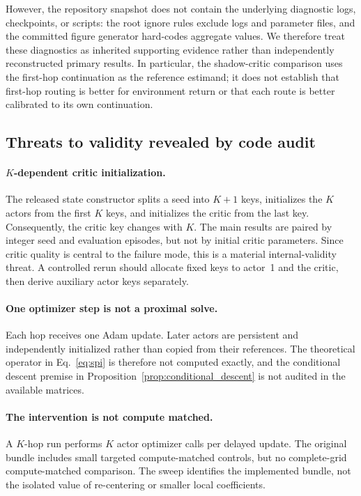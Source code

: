 However, the repository snapshot does not contain the underlying diagnostic logs, checkpoints, or scripts: the root ignore rules exclude logs and parameter files, and the committed figure generator hard-codes aggregate values. We therefore treat these diagnostics as inherited supporting evidence rather than independently reconstructed primary results. In particular, the shadow-critic comparison uses the first-hop continuation as the reference estimand; it does not establish that first-hop routing is better for environment return or that each route is better calibrated to its own continuation.

\subsection{Threats to validity revealed by code audit}
\label{sec:threats}

\paragraph{$K$-dependent critic initialization.}
The released state constructor splits a seed into $K+1$ keys, initializes the $K$ actors from the first $K$ keys, and initializes the critic from the last key. Consequently, the critic key changes with $K$. The main results are paired by integer seed and evaluation episodes, but not by initial critic parameters. Since critic quality is central to the failure mode, this is a material internal-validity threat. A controlled rerun should allocate fixed keys to actor~1 and the critic, then derive auxiliary actor keys separately.

\paragraph{One optimizer step is not a proximal solve.}
Each hop receives one Adam update. Later actors are persistent and independently initialized rather than copied from their references. The theoretical operator in Eq.~\eqref{eq:spi} is therefore not computed exactly, and the conditional descent premise in Proposition~\ref{prop:conditional_descent} is not audited in the available matrices.

\paragraph{The intervention is not compute matched.}
A $K$-hop run performs $K$ actor optimizer calls per delayed update. The original bundle includes small targeted compute-matched controls, but no complete-grid compute-matched comparison. The sweep identifies the implemented bundle, not the isolated value of re-centering or smaller local coefficients.


